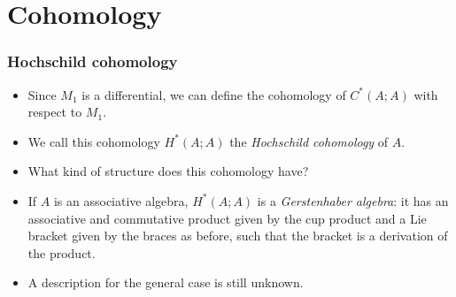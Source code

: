 \documentclass{beamer}
\theoremstyle{definition}
\begin{document}
\section{Cohomology}
\begin{frame}
\frametitle{Hochschild cohomology}
\begin{itemize}
\item<1-> Since $M_1$ is a differential, we can define the  cohomology of $C^*(A;A)$ with respect to $M_1$. 
\item<2-> We call this cohomology $H^*(A;A)$ the \emph{Hochschild cohomology} of $A$.
\item<3-> What kind of structure does this cohomology have?
\end{itemize}
\end{frame}

\begin{frame}
\begin{itemize}

\item<1-> If $A$ is an associative algebra, $H^*(A;A)$ is a \emph{Gerstenhaber algebra}: it has an associative and commutative product given by the cup product and a Lie bracket given by the braces as before, such that the bracket is a derivation of the product.
\item<2-> A description for the general case is still unknown.
\end{itemize}



\end{frame}
\end{document}
